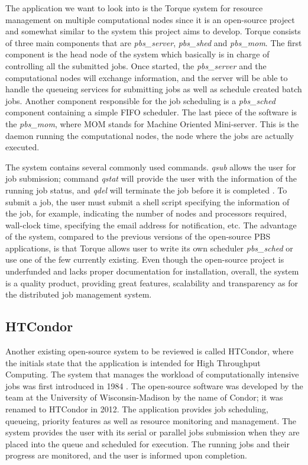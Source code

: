 \documentclass[10pt]{report}
\begin{document}
The application we want to look into is the Torque system for resource management on multiple computational nodes since it is an open-source project and somewhat similar to the system this project aims to develop. Torque consists of three main components that are \textit{pbs\_server}, \textit{pbs\_shed} and \textit{pbs\_mom}. The first component is the head node of the system which basically is in charge of controlling all the submitted jobs. Once started, the \textit{pbs\_server} and the computational nodes will exchange information, and the server will be able to handle the queueing services for submitting jobs as well as schedule created batch jobs. Another component responsible for the job scheduling is a \textit{pbs\_sched} component containing a simple FIFO scheduler. The last piece of the software is the \textit{pbs\_mom}, where MOM stands for Machine Oriented Mini-server. This is the daemon running the computational nodes, the node where the jobs are actually executed.
\newline

The system contains several commonly used commands. \textit{qsub} allows the user for job submission; command \textit{qstat} will provide the user with the information of the running job status, and \textit{qdel} will terminate the job before it is completed \cite{torque}. To submit a job, the user must submit a shell script specifying the information of the job, for example, indicating the number of nodes and processors required, wall-clock time, specifying the email address for notification, etc. The advantage of the system, compared to the previous versions of the open-source PBS applications, is that Torque allows user to write its own scheduler \textit{pbs\_sched} or use one of the few currently existing. Even though the open-source project is underfunded and lacks proper documentation for installation, overall, the system is a quality product, providing great features, scalability and transparency as for the distributed job management system.

\subsection{HTCondor} \label{htc}

Another existing open-source system to be reviewed is called HTCondor, where the initials state that the application is intended for High Throughput Computing. The system that manages the workload of computationally intensive jobs was first introduced in 1984 \cite{firstHTC}. The open-source software was developed by the team at the University of Wisconsin-Madison by the name of Condor; it was renamed to HTCondor in 2012. The application provides job scheduling, queueing, priority features as well as resource monitoring and management. The system provides the user with its serial or parallel jobs submission when they are placed into the queue and scheduled for execution. The running jobs and their progress are monitored, and the user is informed upon completion.
\newline
\end{document}
